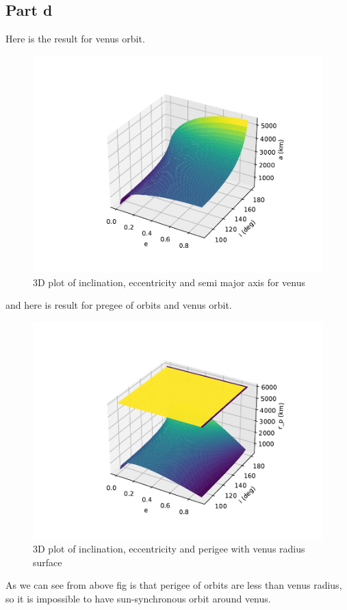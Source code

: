 \subsection{Part d}
Here is the result for venus orbit.\\
\begin{figure}[H]
    \centering
    \includegraphics[width=\textwidth]{../Figure/Q1/Q1d_1}
    \caption{3D plot of inclination, eccentricity and semi major axis for venus}
\end{figure}
and here is result for pregee of orbits and venus orbit.
\begin{figure}[H]
    \centering
    \includegraphics[width=\textwidth]{../Figure/Q1/Q1d_2}
    \caption{3D plot of inclination, eccentricity and perigee with venus radius surface}
\end{figure}
As we can see from above fig is that perigee of orbits are less than venus radius, so it is impossible to have sun-synchronous orbit around venus.
